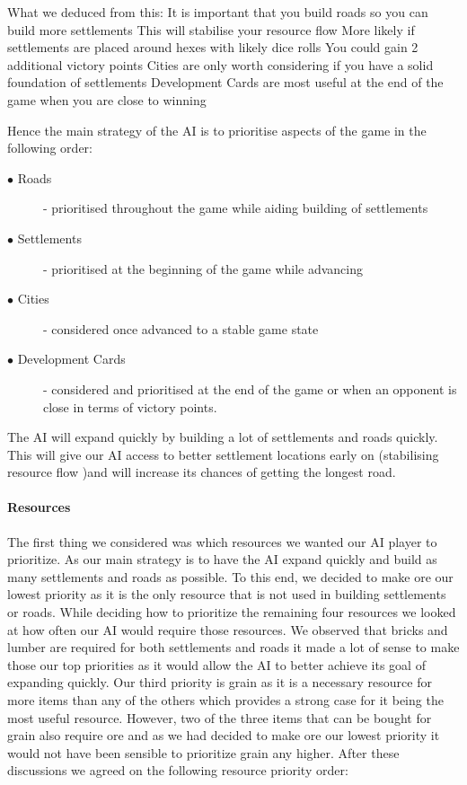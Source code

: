 \documentclass[a4paper,doc,draftfirst]{apa6}
\begin{document}
What we deduced from this:
It is important that you build roads so you can build more settlements 
This will stabilise your resource flow 
More likely if settlements are placed around hexes with likely dice rolls
You could gain 2 additional victory points
Cities are only worth considering if you have a solid foundation of settlements
Development Cards are most useful at the end of the game when you are close to winning

Hence the main strategy of the AI is to prioritise aspects of the game in the following order:

\begin{description}
\item[$\bullet$ Roads] - prioritised throughout the game while aiding building of settlements
\item[$\bullet$ Settlements] - prioritised at the beginning of the game while advancing
\item[$\bullet$ Cities] - considered once advanced to a stable game state 
\item[$\bullet$ Development Cards] - considered and prioritised at the end of the game or when an opponent is close in terms of victory points.
\end{description}

The AI will expand quickly by building a lot of settlements and roads quickly. This will give our AI access to better settlement locations early on (stabilising resource flow )and will increase its chances of getting the longest road. 



\paragraph{Resources}
The first thing we considered was which resources we wanted our AI player to prioritize. As our main strategy is to have the AI expand quickly and build as many settlements and roads as possible. To this end, we decided to make ore our lowest priority as it is the only resource that is not used in building settlements or roads.
While deciding how to prioritize the remaining four resources we looked at how often our AI would require those resources. We observed that bricks and lumber are required for both settlements and roads it made a lot of sense to make those our top priorities as it would allow the AI to better achieve its goal of expanding quickly. Our third priority is grain as it is a necessary resource for more items than any of the others which provides a strong case for it being the most useful resource. However, two of the three items that can be bought for grain also require ore and as we had decided to make ore our lowest priority it would not have been sensible to prioritize grain any higher. After these discussions we agreed on the following resource priority order:
\end{document}
